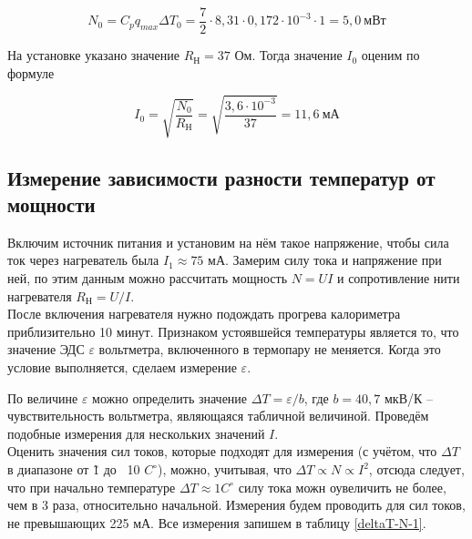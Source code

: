 \documentclass[a4paper,12pt]{article}
\begin{document}
\begin{equation}
    N_0 = C_p q_{max} \Delta T_0 = \frac{7}{2} \cdot 8,31 \cdot 0,172 \cdot 10^{-3} \cdot 1 = 5,0 \ \text{мВт}
\end{equation}

На установке указано значение $R_\text{Н} = 37$ Ом. Тогда значение $I_0$ оценим по формуле

\begin{equation}
    I_0 = \sqrt{ \frac{N_0}{R_\text{Н}} } = \sqrt{ \frac{3,6 \cdot 10^{-3}}{37} } = 11,6 \ \text{мА}
\end{equation}

\subsection{Измерение зависимости разности температур от мощности}
\label{deltaT-N-mesuare}

Включим источник питания и установим на нём такое напряжение, чтобы сила ток через нагреватель была $I_1 \approx 75$ мА. Замерим силу тока и напряжение при ней, по этим данным можно рассчитать мощность $N = UI$ и сопротивление нити нагревателя $R_\text{Н} = U/I$. \\

После включения нагревателя нужно подождать прогрева калориметра приблизительно 10 минут. Признаком устоявшейся температуры является то, что значение ЭДС $\varepsilon$ вольтметра, включенного в термопару не меняется. Когда это условие выполняется, сделаем измерение $\varepsilon$.

По величине $\varepsilon$ можно определить значение $\Delta T = \varepsilon/b$, где $b = 40,7$ мкВ/К -- чувствительность вольтметра, являющаяся табличной величиной. Проведём подобные измерения для нескольких значений $I$. \\

Оценить значения сил токов, которые подходят для измерения (с учётом, что $\Delta T$ в диапазоне от \~1 до ~10 $C^\circ$), можно, учитывая, что $\Delta T \propto N \propto I^2$, отсюда следует, что при начально температуре $\Delta T \approx 1 C^\circ$ силу тока можн оувеличить не более, чем в 3 раза, относительно начальной. Измерения будем проводить для сил токов, не превышающих 225 мА. Все измерения запишем в таблицу \ref{deltaT-N-1}.
\end{document}
